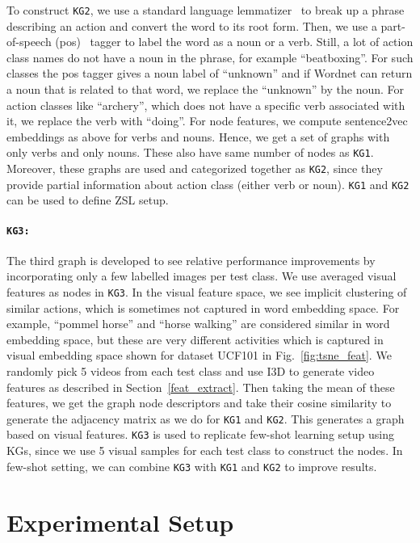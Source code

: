 To construct \texttt{KG2}, we use a standard language lemmatizer~\cite{nltk} to break up a phrase describing an action and convert the word to its root form. Then, we use a part-of-speech (pos)~\cite{pos} tagger to label the word as a noun or a verb. Still, a lot of action class names do not have a noun in the phrase, for example ``beatboxing''. For such classes the pos tagger gives a noun label of ``unknown'' and if Wordnet can return a noun that is related to that word, we replace the ``unknown'' by the noun. For action classes like ``archery'', which does not have a specific verb associated with it, we replace the verb with ``doing''. For node features, we compute sentence2vec embeddings as above for verbs and nouns. Hence, we get a set of graphs with only verbs and only nouns. These also have same number of nodes as \texttt{KG1}. Moreover, these graphs are used and categorized together as \texttt{KG2}, since they provide partial information about action class (either verb or noun). \texttt{KG1} and \texttt{KG2} can be used to define ZSL setup.

\paragraph{\texttt{\bf {KG3:}}} The third graph is developed to see relative performance improvements by incorporating only a few labelled images per test class. We use averaged visual features as nodes in \texttt{KG3}. In the visual feature space, we see implicit clustering of similar actions, which is sometimes not captured in word embedding space. For example, ``pommel horse'' and ``horse walking'' are considered similar in word embedding space, but these are very different activities which is captured in visual embedding space shown for dataset UCF101 in Fig.~\ref{fig:tsne_feat}. We randomly pick 5 videos from each test class and use I3D to generate video features as described in Section~\ref{feat_extract}. Then taking the mean of these features, we get the graph node descriptors and take their cosine similarity to generate the adjacency matrix as we do for \texttt{KG1} and \texttt{KG2}. This generates a graph based on visual features. \texttt{KG3} is used to replicate few-shot learning setup using KGs, since we use 5 visual samples for each test class to construct the nodes. In few-shot setting, we can combine \texttt{KG3} with \texttt{KG1} and \texttt{KG2} to improve results.

\section{Experimental Setup}

